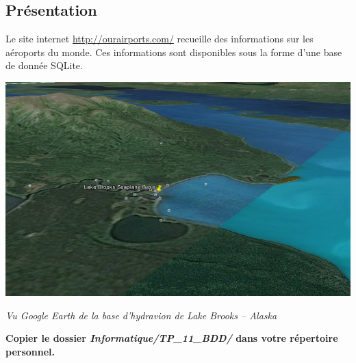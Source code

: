 \documentclass[10pt]{article}
\newif\ifprof
\begin{document}




\subsection*{Présentation}
\ifprof
\else

\begin{minipage}[c]{.5\linewidth}
Le site internet \url{http://ourairports.com/} recueille des informations sur les aéroports du monde. Ces informations sont disponibles sous la forme d'une base de donnée SQLite. 


\end{minipage} \hfill
\begin{minipage}[c]{.5\linewidth}
\begin{center}
\includegraphics[width=.97\linewidth]{images/image}

\textit{Vu Google Earth de la base d'hydravion de Lake Brooks -- Alaska}
\end{center}
\end{minipage}

\vspace{.5cm}

\textbf{Copier le dossier \textsl{Informatique/TP\_11\_BDD/} dans votre répertoire personnel.}

\vspace{.5cm}
\end{document}
